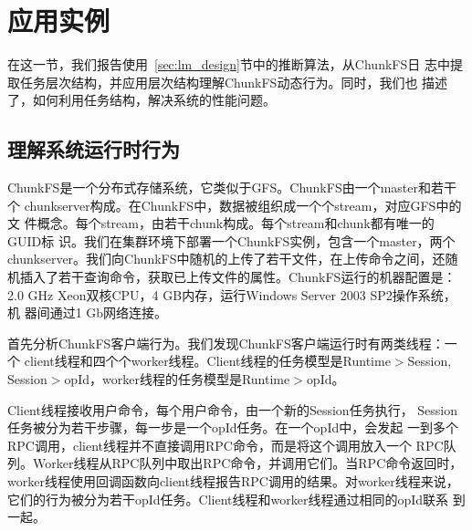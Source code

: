 

\section{应用实例}
\label{sec:lm_case}





在这一节，我们报告使用~\ref{sec:lm_design}节中的推断算法，从ChunkFS日
志中提取任务层次结构，并应用层次结构理解ChunkFS动态行为。同时，我们也
描述了，如何利用任务结构，解决系统的性能问题。

\subsection{理解系统运行时行为}

ChunkFS是一个分布式存储系统，它类似于GFS。ChunkFS由一个master和若干个
chunkserver构成。在ChunkFS中，数据被组织成一个个stream，对应GFS中的文
件概念。每个stream，由若干chunk构成。每个stream和chunk都有唯一的GUID标
识。我们在集群环境下部署一个ChunkFS实例，包含一个master，两个
chunkserver。我们向ChunkFS中随机的上传了若干文件，在上传命令之间，还随
机插入了若干查询命令，获取已上传文件的属性。ChunkFS运行的机器配置是：
2.0 GHz Xeon双核CPU，4 GB内存，运行Windows Server 2003 SP2操作系统，机
器间通过1 Gb网络连接。


首先分析ChunkFS客户端行为。我们发现ChunkFS客户端运行时有两类线程：一个
client线程和四个个worker线程。Client线程的任务模型是Runtime$>$Session,
Session$>$opId，worker线程的任务模型是Runtime$>$opId。

Client线程接收用户命令，每个用户命令，由一个新的Session任务执行，
Session任务被分为若干步骤，每一步是一个opId任务。在一个opId中，会发起
一到多个RPC调用，client线程并不直接调用RPC命令，而是将这个调用放入一个
RPC队列。Worker线程从RPC队列中取出RPC命令，并调用它们。当RPC命令返回时，
worker线程使用回调函数向client线程报告RPC调用的结果。对worker线程来说，
它们的行为被分为若干opId任务。Client线程和worker线程通过相同的opId联系
到一起。


